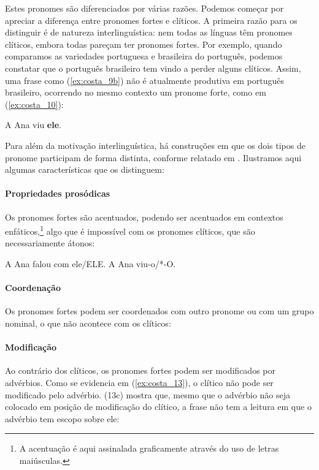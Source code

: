 \documentclass[output=paper]{LSP/langsci}
\begin{document}
Estes pronomes são diferenciados por várias razões. Podemos começar por apreciar a diferença entre pronomes fortes e clíticos. A primeira razão para os distinguir é de natureza interlinguística: nem todas as línguas têm pronomes clíticos, embora todas pareçam ter pronomes fortes. Por exemplo, quando comparamos as variedades portuguesa e brasileira do português, podemos constatar que o português brasileiro tem vindo a perder alguns clíticos. Assim, uma frase como (\ref{ex:costa_9b}) não é atualmente produtiva em português brasileiro, ocorrendo no mesmo contexto um pronome forte, como em (\ref{ex:costa_10}):

\ea\label{ex:costa_10}
A Ana viu \textbf{ele}.
\z

Para além da motivação interlinguística, há construções em que os dois tipos de pronome participam de forma distinta, conforme relatado em \citet{cardinalettistarke1994}. Ilustramos aqui algumas características que os distinguem:

\paragraph*{Propriedades prosódicas} 
Os pronomes fortes são acentuados, podendo ser acentuados em contextos enfáticos,\footnote{A acentuação é aqui assinalada graficamente através do uso de letras maiúsculas.} algo que é impossível com os pronomes clíticos, que são necessariamente átonos:
 

\ea\label{ex:costa_11}
\ea\label{ex:costa_11a} A Ana falou com ele/ELE.
\ex\label{ex:costa_11b} A Ana viu-o/*-O.
\zl
\paragraph*{Coordenação}
Os pronomes fortes podem ser coordenados com outro pronome ou com um grupo nominal, o que não acontece com os clíticos:

\ea\label{ex:costa_12}
\zl

\paragraph*{Modificação}
Ao contrário dos clíticos, os pronomes fortes podem ser modificados por advérbios. Como se evidencia em (\ref{ex:costa_13}), o clítico não pode ser modificado pelo advérbio. (13c) mostra que, mesmo que o advérbio não seja colocado em posição de modificação do clítico, a frase não tem a leitura em que o advérbio tem escopo sobre ele:
\end{document}
